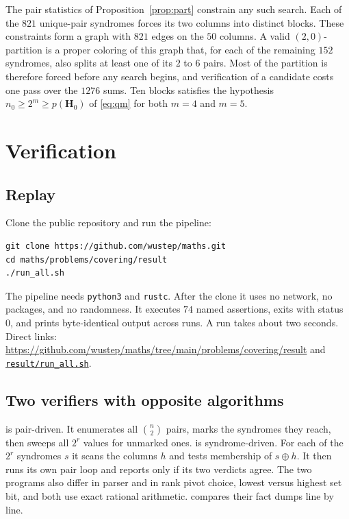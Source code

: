 \documentclass[11pt,a4paper]{article}
\newcommand{\HH}{\boldsymbol{H}}
\theoremstyle{remark}
\begin{document}
The pair statistics of Proposition~\ref{prop:part} constrain any such
search. Each of the $821$ unique-pair syndromes forces its two columns
into distinct blocks. These constraints form a graph with $821$ edges
on the $50$ columns. A valid $(2,0)$-partition is a proper coloring of
this graph that, for each of the remaining $152$ syndromes, also splits
at least one of its $2$ to $6$ pairs. Most of the partition is
therefore forced before any search begins, and verification of a
candidate costs one pass over the $1276$ sums. Ten blocks satisfies the
hypothesis $n_0\ge 2^m\ge p(\HH_0)$ of \eqref{eq:qm} for both $m=4$ and
$m=5$.

\section{Verification}
\label{sec:verif}

\subsection{Replay}

Clone the public repository and run the pipeline:
\begin{verbatim}
git clone https://github.com/wustep/maths.git
cd maths/problems/covering/result
./run_all.sh
\end{verbatim}
The pipeline needs \texttt{python3} and \texttt{rustc}. After the clone
it uses no network, no packages, and no randomness. It executes $74$
named assertions, exits with status $0$, and prints byte-identical
output across runs. A run takes about two seconds. Direct links:
\url{https://github.com/wustep/maths/tree/main/problems/covering/result}
and
\href{https://github.com/wustep/maths/blob/main/problems/covering/result/run_all.sh}{\texttt{result/run\_all.sh}}.

\subsection{Two verifiers with opposite algorithms}

 is pair-driven. It enumerates all
$\binom{n}{2}$ pairs, marks the syndromes they reach, then sweeps all
$2^r$ values for unmarked ones.  is
syndrome-driven. For each of the $2^r$ syndromes $s$ it scans the
columns $h$ and tests membership of $s\oplus h$. It then runs its own
pair loop and reports only if its two verdicts agree. The two programs
also differ in parser and in rank pivot choice, lowest versus highest
set bit, and both use exact rational arithmetic. 
compares their fact dumps line by line.
\end{document}
